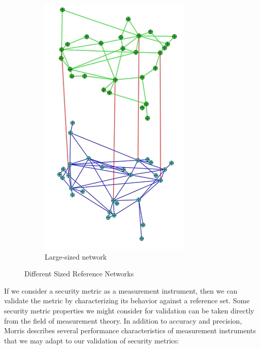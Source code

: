 \begin{figure}
\begin{subfigure}[t]{0.3\textwidth}
        \includegraphics[width=\linewidth]{resource/img/ch_automation/from_ares_paper/net_large.png}
        \caption{Large-sized  network\cite{Cowie_Ogielski_Nicol_2002}}
        \label{fig:refnet_large}
    \end{subfigure}
    \hfill
    \caption{Different Sized Reference Networks}
    \label{fig:refnets}
\end{figure}

If we consider a security metric as a measurement instrument, then we can validate the metric by characterizing its behavior against a reference set. Some security metric properties we might consider for validation can be taken directly from the field of measurement theory. In addition to accuracy and precision, Morris\cite{Morris_2001} describes several performance characteristics of measurement instruments that we may adapt to our validation of security metrics:

